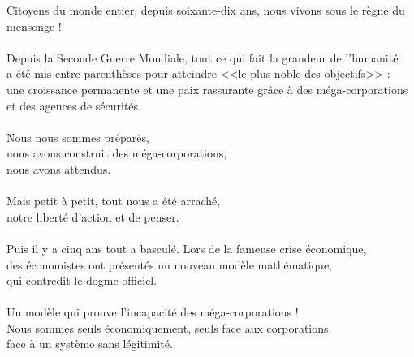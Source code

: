 \documentclass[11pt,twoside,a4paper]{article}
\begin{document}
\begin{center} \begin{bfseries} \begin{scshape}

\pagecolor{white}

\textcolor{titlered}{\LARGE Citoyens du monde entier, }
\textcolor{titlered}{\LARGE depuis soixante-dix ans, }
\textcolor{titlered}{\LARGE nous vivons sous le r{\`e}gne du mensonge ! }~\\

~\\

Depuis la Seconde Guerre Mondiale, tout ce qui fait la grandeur de l'humanit{\'e}~\\
a {\'e}t{\'e} mis entre parenth{\`e}ses pour atteindre <<le plus noble des objectifs>> :~\\
une croissance permanente et une paix rassurante gr{\^a}ce {\`a} des m{\'e}ga-corporations et des agences de s{\'e}curit{\'e}s.~\\

~\\

Nous nous sommes pr{\'e}par{\'e}s, ~\\nous avons construit des m{\'e}ga-corporations, ~\\
nous avons attendus.~\\

~\\

Mais petit {\`a} petit, tout nous a {\'e}t{\'e} arrach{\'e}, ~\\
notre libert{\'e} d'action et de penser.~\\ 

~\\

Puis il y a cinq ans tout a bascul{\'e}. Lors de la fameuse crise {\'e}conomique, ~\\
des {\'e}conomistes ont pr{\'e}sent{\'e}s un nouveau mod{\`e}le math{\'e}matique, ~\\
qui contredit le dogme officiel.~\\ 

~\\

Un mod{\`e}le qui prouve l'incapacit{\'e} des m{\'e}ga-corporations ! ~\\
Nous sommes seuls {\'e}conomiquement, seuls face aux corporations, ~\\
face {\`a} un syst{\`e}me sans l{\'e}gitimit{\'e}.~\\


\end{scshape}
\end{bfseries}
\end{center}
\end{document}

